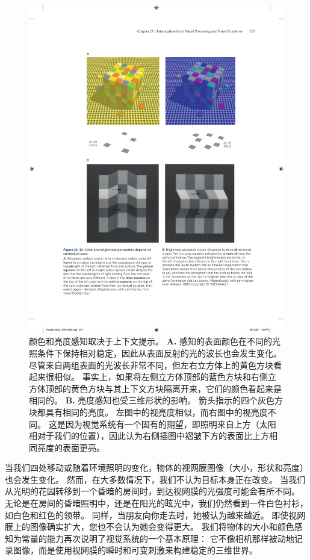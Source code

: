 \begin{figure}[htbp]
	\centering
	\includegraphics[width=1.0\linewidth]{chap23/fig_23_12}
	\caption{颜色和亮度感知取决于上下文提示。
		\textbf{A.} 感知的表面颜色在不同的光照条件下保持相对稳定，因此从表面反射的光的波长也会发生变化。
		尽管来自两组表面的光波长非常不同，但左右立方体上的黄色方块看起来很相似。
		事实上，如果将左侧立方体顶部的蓝色方块和右侧立方体顶部的黄色方块与其上下文方块隔离开来，它们的颜色看起来是相同的。
		\textbf{B.} 亮度感知也受三维形状的影响。
		箭头指示的四个灰色方块都具有相同的亮度。
		左图中的视亮度相似，而右图中的视亮度不同。
		这是因为视觉系统有一个固有的期望，即照明来自上方（太阳相对于我们的位置），因此认为右侧插图中褶皱下方的表面比上方相同亮度的表面更亮\cite{adelson1993perceptual}。}
	\label{fig:23_12}
\end{figure}


当我们四处移动或随着环境照明的变化，物体的视网膜图像（大小，形状和亮度）也会发生变化。
然而，在大多数情况下，我们不认为目标本身正在改变。
当我们从光明的花园转移到一个昏暗的房间时，到达视网膜的光强度可能会有所不同。
无论是在房间的昏暗照明中，还是在阳光的眩光中，我们仍然看到一件白色衬衫，如白色和红色的领带。
同样，当朋友向你走去时，她被认为越来越近。
即使视网膜上的图像确实扩大，您也不会认为她会变得更大。
我们将物体的大小和颜色感知为常量的能力再次说明了视觉系统的一个基本原理：
它不像相机那样被动地记录图像，而是使用视网膜的瞬时和可变刺激来构建稳定的三维世界。


